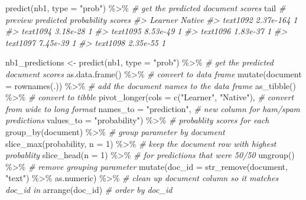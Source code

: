 \documentclass[
]{article}
\newenvironment{Shaded}{\begin{snugshade}}{\end{snugshade}}
\newcommand{\AttributeTok}[1]{\textcolor[rgb]{0.77,0.63,0.00}{#1}}
\newcommand{\CommentTok}[1]{\textcolor[rgb]{0.56,0.35,0.01}{\textit{#1}}}
\newcommand{\DecValTok}[1]{\textcolor[rgb]{0.00,0.00,0.81}{#1}}
\newcommand{\FunctionTok}[1]{\textcolor[rgb]{0.00,0.00,0.00}{#1}}
\newcommand{\NormalTok}[1]{#1}
\newcommand{\OtherTok}[1]{\textcolor[rgb]{0.56,0.35,0.01}{#1}}
\newcommand{\SpecialCharTok}[1]{\textcolor[rgb]{0.00,0.00,0.00}{#1}}
\newcommand{\StringTok}[1]{\textcolor[rgb]{0.31,0.60,0.02}{#1}}
\begin{document}
\begin{Shaded}
\begin{Highlighting}[]
\FunctionTok{predict}\NormalTok{(nb1, }\AttributeTok{type =} \StringTok{"prob"}\NormalTok{) }\SpecialCharTok{\%\textgreater{}\%} \CommentTok{\# get the predicted document scores}
\NormalTok{  tail }\CommentTok{\# preview predicted probability scores}
\CommentTok{\#\textgreater{}            Learner Native}
\CommentTok{\#\textgreater{} text1092 2.37e{-}164      1}
\CommentTok{\#\textgreater{} text1094  3.18e{-}28      1}
\CommentTok{\#\textgreater{} text1095  8.53e{-}49      1}
\CommentTok{\#\textgreater{} text1096  1.83e{-}37      1}
\CommentTok{\#\textgreater{} text1097  7.45e{-}39      1}
\CommentTok{\#\textgreater{} text1098  2.35e{-}55      1}
\end{Highlighting}
\end{Shaded}

\begin{Shaded}
\begin{Highlighting}[]
\NormalTok{nb1\_predictions }\OtherTok{\textless{}{-}} 
  \FunctionTok{predict}\NormalTok{(nb1, }\AttributeTok{type =} \StringTok{"prob"}\NormalTok{) }\SpecialCharTok{\%\textgreater{}\%} \CommentTok{\# get the predicted document scores}
  \FunctionTok{as.data.frame}\NormalTok{() }\SpecialCharTok{\%\textgreater{}\%} \CommentTok{\# convert to data frame}
  \FunctionTok{mutate}\NormalTok{(}\AttributeTok{document =} \FunctionTok{rownames}\NormalTok{(.)) }\SpecialCharTok{\%\textgreater{}\%} \CommentTok{\# add the document names to the data frame}
  \FunctionTok{as\_tibble}\NormalTok{() }\SpecialCharTok{\%\textgreater{}\%} \CommentTok{\# convert to tibble}
  \FunctionTok{pivot\_longer}\NormalTok{(}\AttributeTok{cols =} \FunctionTok{c}\NormalTok{(}\StringTok{"Learner"}\NormalTok{, }\StringTok{"Native"}\NormalTok{), }\CommentTok{\# convert from wide to long format}
               \AttributeTok{names\_to =} \StringTok{"prediction"}\NormalTok{, }\CommentTok{\# new column for ham/spam predictions}
               \AttributeTok{values\_to =} \StringTok{"probability"}\NormalTok{) }\SpecialCharTok{\%\textgreater{}\%} \CommentTok{\# probablity scores for each}
  \FunctionTok{group\_by}\NormalTok{(document) }\SpecialCharTok{\%\textgreater{}\%} \CommentTok{\# group parameter by document}
  \FunctionTok{slice\_max}\NormalTok{(probability, }\AttributeTok{n =} \DecValTok{1}\NormalTok{) }\SpecialCharTok{\%\textgreater{}\%} \CommentTok{\# keep the document row with highest probablity}
  \FunctionTok{slice\_head}\NormalTok{(}\AttributeTok{n =} \DecValTok{1}\NormalTok{) }\SpecialCharTok{\%\textgreater{}\%} \CommentTok{\# for predictions that were 50/50 }
  \FunctionTok{ungroup}\NormalTok{() }\SpecialCharTok{\%\textgreater{}\%} \CommentTok{\# remove grouping parameter}
  \FunctionTok{mutate}\NormalTok{(}\AttributeTok{doc\_id =} \FunctionTok{str\_remove}\NormalTok{(document, }\StringTok{"text"}\NormalTok{) }\SpecialCharTok{\%\textgreater{}\%}\NormalTok{ as.numeric) }\SpecialCharTok{\%\textgreater{}\%} \CommentTok{\# clean up document column so it matches doc\_id in}
  \FunctionTok{arrange}\NormalTok{(doc\_id) }\CommentTok{\# order by doc\_id}


\end{Highlighting}
\end{Shaded}
\end{document}
